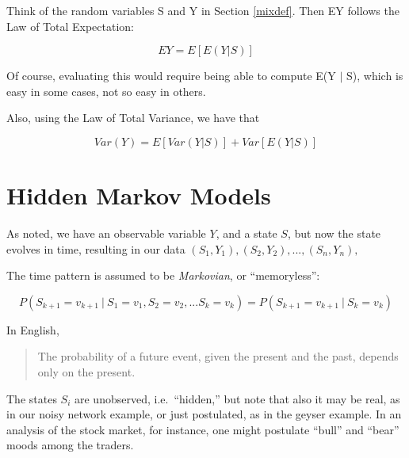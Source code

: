 \documentclass[11pt]{article}
\begin{document}
Think of the random variables S and Y in Section \ref{mixdef}.
Then EY follows the Law of Total Expectation:

\begin{equation}
\label{mixmean}
EY = E[E(Y | S)]
\end{equation}

Of course, evaluating this would require being able to compute E(Y $|$
S), which is easy in some cases, not so easy in others.

Also, using the Law of Total Variance, we have that

\begin{equation}
\label{mixvar}
Var(Y) = E[Var(Y|S)] + Var[E(Y|S)]
\end{equation}

\section{Hidden Markov Models}

As noted, we have an observable variable $Y$, and a state $S$, but now
the state evolves in time, resulting in our data
$
(S_1,Y_1),
(S_2,Y_2),
...,
(S_n,Y_n),
$

The time pattern is assumed to be \textit{Markovian}, or ``memoryless'':

\begin{equation}
P(S_{k+1} = v_{k+1} ~|~ S_1 = v_1, S_2 = v_2, ...  S_k = v_k) =
P(S_{k+1} = v_{k+1} ~|~ S_k = v_k) 
\end{equation}

In English,

\begin{quote}
The probability of a future event, given the present and the past,
depends only on the present.
\end{quote}

The states $S_i$ are unobserved, i.e.\ ``hidden,'' but note that also it
may be real, as in our noisy network example, or just postulated, as in
the geyser example.  In an analysis of the stock market, for instance,
one might postulate ``bull'' and ``bear'' moods among the traders.
\end{document}
